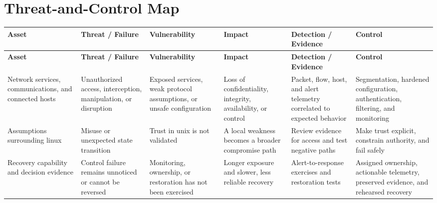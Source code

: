 \documentclass[11pt]{article}
\begin{document}
\section*{Threat-and-Control Map}
\begingroup\scriptsize\setlength{\tabcolsep}{2pt}
\begin{longtable}{>{\RaggedRight\arraybackslash}p{}>{\RaggedRight\arraybackslash}p{}>{\RaggedRight\arraybackslash}p{}>{\RaggedRight\arraybackslash}p{}>{\RaggedRight\arraybackslash}p{}>{\RaggedRight\arraybackslash}p{}}
\toprule\rowcolor{Navy}\color{white}\textbf{Asset} & \color{white}\textbf{Threat / Failure} & \color{white}\textbf{Vulnerability} & \color{white}\textbf{Impact} & \color{white}\textbf{Detection / Evidence} & \color{white}\textbf{Control}\\\midrule
\endfirsthead
\toprule\rowcolor{Navy}\color{white}\textbf{Asset} & \color{white}\textbf{Threat / Failure} & \color{white}\textbf{Vulnerability} & \color{white}\textbf{Impact} & \color{white}\textbf{Detection / Evidence} & \color{white}\textbf{Control}\\\midrule
\endhead
Network services, communications, and connected hosts & Unauthorized access, interception, manipulation, or disruption & Exposed services, weak protocol assumptions, or unsafe configuration & Loss of confidentiality, integrity, availability, or control & Packet, flow, host, and alert telemetry correlated to expected behavior & Segmentation, hardened configuration, authentication, filtering, and monitoring\\\midrule
Assumptions surrounding linux & Misuse or unexpected state transition & Trust in unix is not validated & A local weakness becomes a broader compromise path & Review evidence for access and test negative paths & Make trust explicit, constrain authority, and fail safely\\\midrule
Recovery capability and decision evidence & Control failure remains unnoticed or cannot be reversed & Monitoring, ownership, or restoration has not been exercised & Longer exposure and slower, less reliable recovery & Alert-to-response exercises and restoration tests & Assigned ownership, actionable telemetry, preserved evidence, and rehearsed recovery\\\midrule
\bottomrule
\end{longtable}
\endgroup
\end{document}
